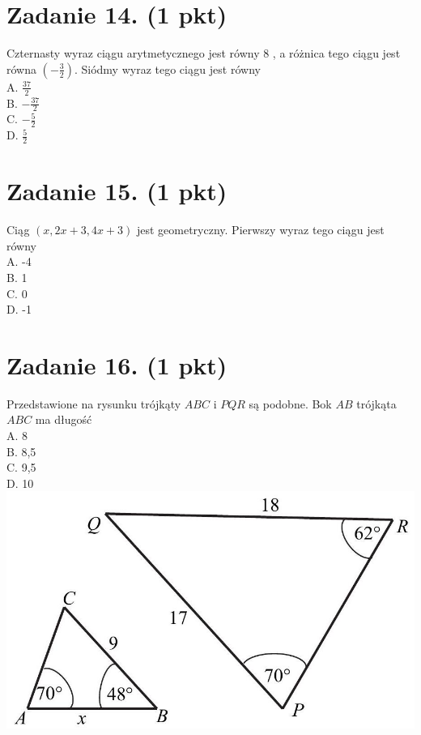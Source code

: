 \documentclass[10pt]{article}
\begin{document}
\section*{Zadanie 14. (1 pkt)}
Czternasty wyraz ciągu arytmetycznego jest równy 8 , a różnica tego ciągu jest równa \(\left(-\frac{3}{2}\right)\). Siódmy wyraz tego ciągu jest równy\\
A. \(\frac{37}{2}\)\\
B. \(-\frac{37}{2}\)\\
C. \(-\frac{5}{2}\)\\
D. \(\frac{5}{2}\)

\section*{Zadanie 15. (1 pkt)}
Ciąg \((x, 2 x+3,4 x+3)\) jest geometryczny. Pierwszy wyraz tego ciągu jest równy\\
A. -4\\
B. 1\\
C. 0\\
D. -1

\section*{Zadanie 16. (1 pkt)}
Przedstawione na rysunku trójkąty \(A B C\) i \(P Q R\) są podobne. Bok \(A B\) trójkąta \(A B C\) ma długość\\
A. 8\\
B. 8,5\\
C. 9,5\\
D. 10\\
\includegraphics[max width=\textwidth, center]{2024_11_21_779b7f825da3a12753feg-06}
\end{document}
